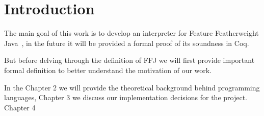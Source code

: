\chapter{Introduction}

The main goal of this work is to develop an interpreter for Feature
Featherweight Java~\cite{Igarashi99featherweightjava}, in the future it will be
provided a formal proof of its soundness in Coq.

But before delving through the definition of FFJ we will first provide
important formal definition to better understand the motivation of our work.

In the Chapter 2 we will provide the theoretical background behind programming
languages, Chapter 3 we discuss our implementation decisions for the project.
Chapter 4

